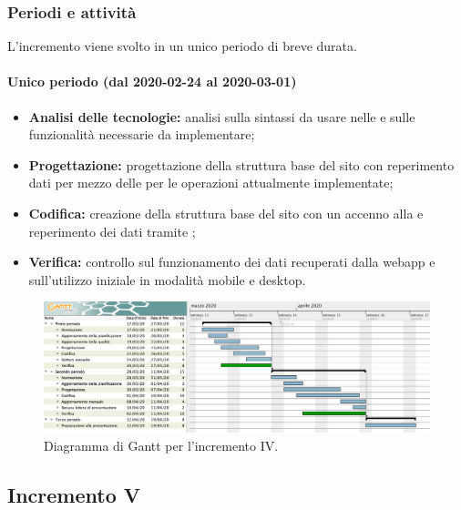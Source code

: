 			\subsubsection{Periodi e attività}
			
				L'incremento viene svolto in un unico periodo di breve durata.
				
				\paragraph{Unico periodo (dal 2020-02-24 al 2020-03-01)}
				
					\begin{itemize}
						\item \textbf{Analisi delle tecnologie:} analisi sulla sintassi da usare nelle  e sulle funzionalità necessarie da implementare;	
						\item \textbf{Progettazione:} progettazione della struttura base del sito con reperimento dati per mezzo delle  per le operazioni attualmente implementate;
						\item \textbf{Codifica:} creazione della struttura base del sito con un accenno alla  e reperimento dei dati tramite ;
						\item \textbf{Verifica:} controllo sul funzionamento dei dati recuperati dalla webapp e sull'utilizzo iniziale in modalità mobile e desktop.
					\end{itemize} 			

		\begin{landscape}
          \begin{figure}[H]
            \centering
            \includegraphics[width=\linewidth]{images/ganttDettaglioCodifica} %
            \caption{Diagramma di Gantt per l'incremento IV.}
          \end{figure}		
		\end{landscape}


		\subsection{Incremento V}
			
